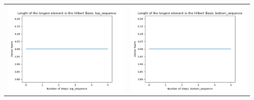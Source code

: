 \documentclass[10pt]{article}
\begin{document}
\begin{tabular}{c|c}
\begin{minipage}{.45\textwidth}
\includegraphics[width=\textwidth]{"DATA/5d/5 generators 2 bound G/top_sequence LENGTH"}
\end{minipage} &
\begin{minipage}{.45\textwidth}
\includegraphics[width=\textwidth]{"DATA/5d/5 generators 2 bound G bottomup/bottom_sequence LENGTH"}
\end{minipage}
\end{tabular}
\end{document}
